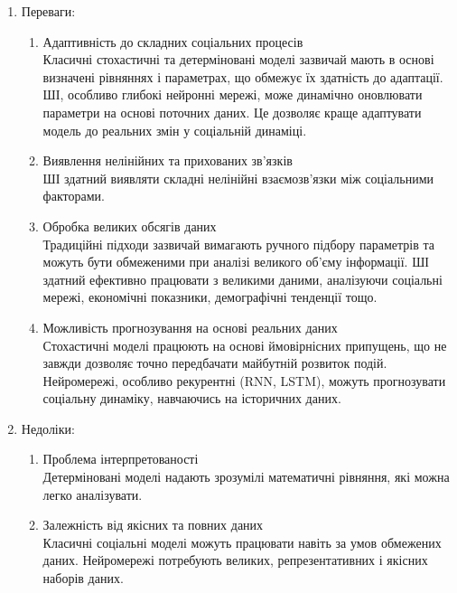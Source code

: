 \documentclass[a4paper,12pt]{article}
\begin{document}
    \begin{enumerate}
        \item Переваги:
        \begin{enumerate}
            \item Адаптивність до складних соціальних процесів \\
            Класичні стохастичні та детерміновані моделі зазвичай мають в основі визначені рівняннях і параметрах, що обмежує їх здатність до адаптації.
            ШІ, особливо глибокі нейронні мережі, може динамічно оновлювати параметри на основі поточних даних. Це дозволяє краще адаптувати модель до реальних змін у соціальній динаміці.
            
            \item Виявлення нелінійних та прихованих зв’язків \\
            ШІ здатний виявляти складні нелінійні взаємозв’язки між соціальними факторами.
            
            \item Обробка великих обсягів даних \\
            Традиційні підходи зазвичай вимагають ручного підбору параметрів та можуть бути обмеженими при аналізі великого об'єму інформації.
            ШІ здатний ефективно працювати з великими даними, аналізуючи соціальні мережі, економічні показники, демографічні тенденції тощо.
            
            \item Можливість прогнозування на основі реальних даних \\
            Стохастичні моделі працюють на основі ймовірнісних припущень, що не завжди дозволяє точно передбачати майбутній розвиток подій.
            Нейромережі, особливо рекурентні (RNN, LSTM), можуть прогнозувати соціальну динаміку, навчаючись на історичних даних.
        \end{enumerate}
        \item Недоліки:
        \begin{enumerate}
            \item Проблема інтерпретованості \\
            Детерміновані моделі надають зрозумілі математичні рівняння, які можна легко аналізувати.

            \item Залежність від якісних та повних даних \\
            Класичні соціальні моделі можуть працювати навіть за умов обмежених даних.
            Нейромережі потребують великих, репрезентативних і якісних наборів даних.
        

\end{enumerate}
\end{enumerate}
\end{document}
